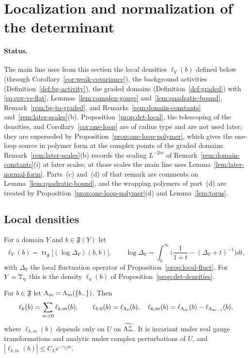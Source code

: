 \section{Localization and normalization of the determinant}\label{sec:det-local}

\paragraph{Status.} The main line uses from this section the local densities $\ell_Y(b)$ defined below (through Corollary~\ref{cor:weak-covariance}), the background activities (Definition~\ref{def:bg-activity}), the graded domains (Definition~\ref{def:graded}) with \eqref{eq:cov-vs-flat}, Lemmas~\ref{lem:complex-gauge} and~\ref{lem:quadratic-bound}, Remark~\ref{rem:bg-to-graded}, and Remarks~\ref{rem:domain-constants} and~\ref{rem:later-scales}(b). Proposition~\ref{prop:det-local}, the telescoping of the densities, and Corollary~\ref{cor:one-loop} are of radius type and are not used later; they are superseded by Proposition~\ref{prop:one-loop-polymer}, which gives the one-loop source in polymer form at the complex points of the graded domains. Remark~\ref{rem:later-scales}(b) records the scaling $L^{-2m}$ of Remark~\ref{rem:domain-constants}(i) at later scales; at those scales the main line uses Lemma~\ref{lem:later-normal-form}. Parts~(c) and~(d) of that remark are comments on Lemma~\ref{lem:quadratic-bound}, and the wrapping polymers of part~(d) are treated by Proposition~\ref{prop:one-loop-polymer}(d) and Lemma~\ref{lem:torus}.

\subsection{Local densities}\label{ss:38.1}

For a domain $Y$ and $b\in\mathfrak F(Y)$ let
\[
\ell_Y(b)=\operatorname{tr}_{\mathfrak g}\big[(\log\Delta_Y)(b,b)\big],\qquad\log\Delta_Y=\int_0^\infty\Big(\frac1{1+t}-(\Delta_Y+t)^{-1}\Big)dt,
\]
with $\Delta_Y$ the local fluctuation operator of Proposition~\ref{prop:local-fluct}. For $Y=\mathbb T_\eta$ this is the density $\ell_k(b)$ of Proposition~\ref{prop:det-densities}.

\begin{proposition}\label{prop:det-local}
For $b\in\mathfrak F$ let $\Lambda_m=\Lambda_m(\{b_-\})$. Then
\[
\ell_k(b)=\sum_{m\ge0}\ell_{k,m}(b),\qquad\ell_{k,0}(b)=\ell_{\Lambda_0}(b),\quad\ell_{k,m}(b)=\ell_{\Lambda_m}(b)-\ell_{\Lambda_{m-1}}(b),
\]
where $\ell_{k,m}(b)$ depends only on $U$ on $\widehat{\Lambda_m^+}$. It is invariant under real gauge transformations and analytic under complex perturbations of $U$, and $|\ell_{k,m}(b)|\le C_Le^{-\gamma_3m}$.
\end{proposition}

